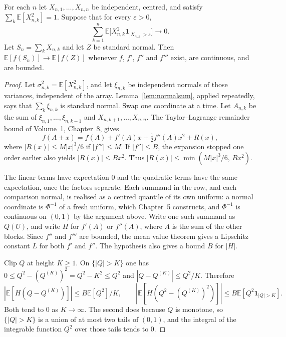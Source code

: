 \begin{theorem}[Lindeberg]\label{thm:lindeberg}
For each $n$ let $X_{n,1},\ldots,X_{n,n}$ be independent, centred, and satisfy $\sum_k\mathbb E[X_{n,k}^2]=1$. Suppose that for every $\varepsilon>0$,
\[
\sum_{k=1}^n\mathbb E\bigl[X_{n,k}^2\mathbf 1_{|X_{n,k}|>\varepsilon}\bigr]\to0.
\]
Let $S_n=\sum_k X_{n,k}$ and let $Z$ be standard normal. Then $\mathbb E[f(S_n)]\to\mathbb E[f(Z)]$ whenever $f$, $f'$, $f''$ and $f'''$ exist, are continuous, and are bounded.
\end{theorem}
\begin{proof}
Let $\sigma_{n,k}^2=\mathbb E[X_{n,k}^2]$, and let $\xi_{n,k}$ be independent normals of those variances, independent of the array. Lemma~\ref{lem:normalsum}, applied repeatedly, says that $\sum_k\xi_{n,k}$ is standard normal. Swap one coordinate at a time. Let $A_{n,k}$ be the sum of $\xi_{n,1},\ldots,\xi_{n,k-1}$ and $X_{n,k+1},\ldots,X_{n,n}$. The Taylor--Lagrange remainder bound of Volume~1, Chapter~8, gives
\[
f(A+x)=f(A)+f'(A)x+\tfrac12 f''(A)x^2+R(x),
\]
where $|R(x)|\le M|x|^3/6$ if $|f'''|\le M$. If $|f''|\le B$, the expansion stopped one order earlier also yields $|R(x)|\le B x^2$. Thus $|R(x)|\le\min(M|x|^3/6,\,Bx^2)$.

The linear terms have expectation $0$ and the quadratic terms have the same expectation, once the factors separate. Each summand in the row, and each comparison normal, is realised as a centred quantile of its own uniform: a normal coordinate is $\Phi^{-1}$ of a fresh uniform, which Chapter~5 constructs, and $\Phi^{-1}$ is continuous on $(0,1)$ by the argument above. Write one such summand as $Q(U)$, and write $H$ for $f'(A)$ or $f''(A)$, where $A$ is the sum of the other blocks. Since $f''$ and $f'''$ are bounded, the mean value theorem gives a Lipschitz constant $L$ for both $f'$ and $f''$. The hypothesis also gives a bound $B$ for $|H|$.

Clip $Q$ at height $K\ge1$. On $\{|Q|>K\}$ one has $0\le Q^2-(Q^{(K)})^2=Q^2-K^2\le Q^2$ and $|Q-Q^{(K)}|\le Q^2/K$. Therefore
\[
 |\mathbb E[H(Q-Q^{(K)})]|\le B\mathbb E[Q^2]/K,
 \qquad
 |\mathbb E[H(Q^2-(Q^{(K)})^2)]|\le B\mathbb E[Q^2\mathbf 1_{|Q|>K}].
\]
Both tend to $0$ as $K\to\infty$. The second does because $Q$ is monotone, so $\{|Q|>K\}$ is a union of at most two tails of $(0,1)$, and the integral of the integrable function $Q^2$ over those tails tends to $0$.


\end{proof}
